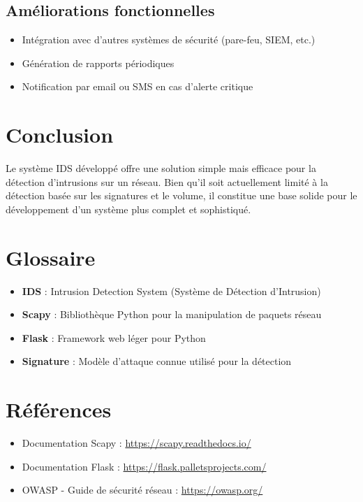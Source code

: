 \documentclass[12pt,a4paper]{article}
\begin{document}
\subsection{Améliorations fonctionnelles}
\begin{itemize}
    \item Intégration avec d'autres systèmes de sécurité (pare-feu, SIEM, etc.)
    \item Génération de rapports périodiques
    \item Notification par email ou SMS en cas d'alerte critique
\end{itemize}

\section{Conclusion}
Le système IDS développé offre une solution simple mais efficace pour la détection d'intrusions sur un réseau. Bien qu'il soit actuellement limité à la détection basée sur les signatures et le volume, il constitue une base solide pour le développement d'un système plus complet et sophistiqué.

\appendix
\section{Glossaire}
\begin{itemize}
    \item \textbf{IDS} : Intrusion Detection System (Système de Détection d'Intrusion)
    \item \textbf{Scapy} : Bibliothèque Python pour la manipulation de paquets réseau
    \item \textbf{Flask} : Framework web léger pour Python
    \item \textbf{Signature} : Modèle d'attaque connue utilisé pour la détection
\end{itemize}

\section{Références}
\begin{itemize}
    \item Documentation Scapy : \url{https://scapy.readthedocs.io/}
    \item Documentation Flask : \url{https://flask.palletsprojects.com/}
    \item OWASP - Guide de sécurité réseau : \url{https://owasp.org/}
\end{itemize}
\end{document}
